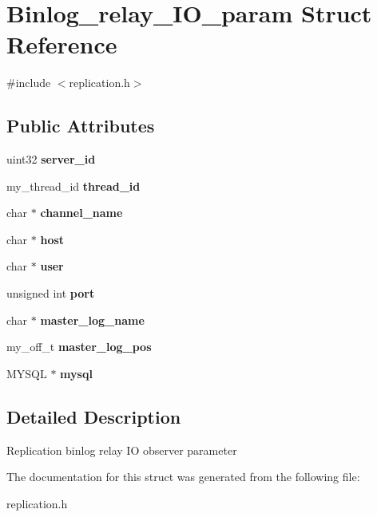 \hypertarget{structBinlog__relay__IO__param}{}\section{Binlog\+\_\+relay\+\_\+\+I\+O\+\_\+param Struct Reference}
\label{structBinlog__relay__IO__param}


{\ttfamily \#include $<$replication.\+h$>$}

\subsection*{Public Attributes}
\begin{DoxyCompactItemize}
\item 
\mbox{\label{structBinlog__relay__IO__param_af6769969001bf5e77aec9b602a8b465f}} 
uint32 {\bfseries server\+\_\+id}
\item 
\mbox{\label{structBinlog__relay__IO__param_afb150dc2116c7a6be75178538279e4a0}} 
my\+\_\+thread\+\_\+id {\bfseries thread\+\_\+id}
\item 
\mbox{\label{structBinlog__relay__IO__param_a61107579f6d6f927019c40277f62ae4b}} 
char $\ast$ {\bfseries channel\+\_\+name}
\item 
\mbox{\label{structBinlog__relay__IO__param_a83cb28ac6f136130f9bc5bbe2f7b1b4a}} 
char $\ast$ {\bfseries host}
\item 
\mbox{\label{structBinlog__relay__IO__param_a9d3ba8bac306d25a1c795f8b44a8cfdb}} 
char $\ast$ {\bfseries user}
\item 
\mbox{\label{structBinlog__relay__IO__param_a1644aba8f8f7bc1802b000c7fc85fb21}} 
unsigned int {\bfseries port}
\item 
\mbox{\label{structBinlog__relay__IO__param_a876b69fe3756ec62e758ee9d67abdd8f}} 
char $\ast$ {\bfseries master\+\_\+log\+\_\+name}
\item 
\mbox{\label{structBinlog__relay__IO__param_a15cd525565150ca1ae94e0b792f2fd53}} 
my\+\_\+off\+\_\+t {\bfseries master\+\_\+log\+\_\+pos}
\item 
\mbox{\label{structBinlog__relay__IO__param_ab9f4fdeeec0373d49f45406f56d48111}} 
M\+Y\+S\+QL $\ast$ {\bfseries mysql}
\end{DoxyCompactItemize}


\subsection{Detailed Description}
Replication binlog relay IO observer parameter 

The documentation for this struct was generated from the following file\+:\begin{DoxyCompactItemize}
\item 
replication.\+h\end{DoxyCompactItemize}
